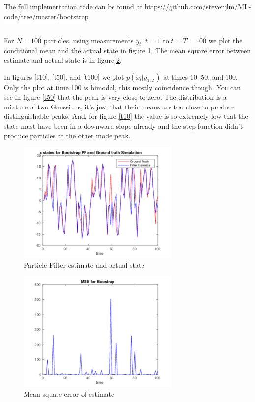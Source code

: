 \documentclass[11pt]{article}
\begin{document}
The full implementation code can be found at \url{https://github.com/stevenjlm/ML-code/tree/master/bootstrap}

\subsection{}

For $N=100$ particles, using measurements $y_t$, $t=1$ to $t=T=100$ we plot the conditional mean and the actual state in figure \ref{bs}. The mean square error between estimate and actual state is in figure \ref{mse}.

In figures \ref{t10}, \ref{t50}, and \ref{t100} we plot $p(x_{t}|y_{1:T})$ at times 10, 50, and 100. Only the plot at time 100 is bimodal, this mostly coincidence though. You can see in figure \ref{t50} that the peak is very close to zero. The distribution is a mixture of two Gaussians, it's just that their means are too close to produce distinguishable peaks. And, for figure \ref{t10} the value is so extremely low that the state must have been in a downward slope already and the step function didn't produce particles at the other mode peak.

\begin{figure}[h]
  
  \centering
    \includegraphics[width=80mm]{../figs/003_13_gt-and-bt.pdf}
    \caption{Particle Filter estimate and actual state}
    \label{bs}
\end{figure}

\begin{figure}[h]
  
  \centering
    \includegraphics[width=80mm]{../figs/004_13_mse.pdf}
    \caption{Mean square error of estimate}
    \label{mse}
\end{figure}
\end{document}
